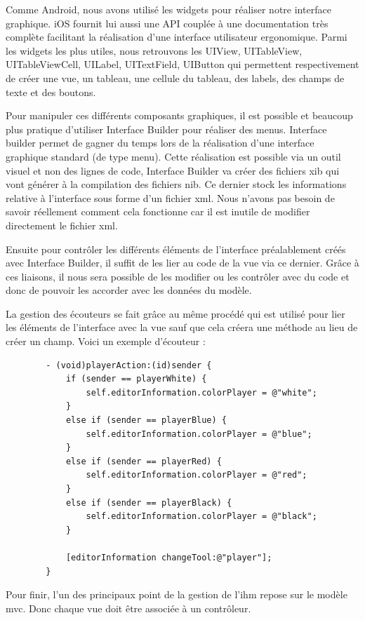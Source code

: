 	Comme Android, nous avons utilisé les widgets pour réaliser notre interface graphique. iOS fournit lui aussi une API couplée à une documentation très complète facilitant la réalisation d'une interface utilisateur ergonomique. Parmi les widgets les plus utiles, nous retrouvons les UIView, UITableView, UITableViewCell, UILabel, UITextField, UIButton qui permettent respectivement de créer une vue, un tableau, une cellule du tableau, des labels, des champs de texte et des boutons.
	
	Pour manipuler ces différents composants graphiques, il est possible et beaucoup plus pratique d'utiliser Interface Builder pour réaliser des menus. Interface builder permet de gagner du temps lors de la réalisation d'une interface graphique standard (de type menu). Cette réalisation est possible via un outil visuel et non des lignes de code,  Interface Builder va créer des fichiers \gls{xib} qui vont générer à la compilation des fichiers \gls{nib}. Ce dernier stock les informations relative à l'interface sous forme d'un fichier \gls{xml}. Nous n'avons pas besoin de savoir réellement comment cela fonctionne car il est inutile de modifier directement le fichier \gls{xml}.
	
	Ensuite pour contrôler les différents éléments de l'interface préalablement créés avec Interface Builder, il suffit de les lier au code de la vue via ce dernier. Grâce à ces liaisons, il nous sera possible de les modifier ou les contrôler avec du code et donc de pouvoir les accorder avec les données du modèle.
	
	La gestion des écouteurs se fait grâce au même procédé qui est utilisé pour lier les éléments de l'interface avec la vue sauf que cela créera une méthode au lieu de créer un champ. Voici un exemple d'écouteur :
	
	\begin{verbatim}
		- (void)playerAction:(id)sender {
		    if (sender == playerWhite) {
		        self.editorInformation.colorPlayer = @"white";
		    }
		    else if (sender == playerBlue) {
		        self.editorInformation.colorPlayer = @"blue";
		    }
		    else if (sender == playerRed) {
		        self.editorInformation.colorPlayer = @"red";
		    }
		    else if (sender == playerBlack) {
		        self.editorInformation.colorPlayer = @"black";
		    }
    
		    [editorInformation changeTool:@"player"];
		}
	\end{verbatim}
	
	Pour finir, l'un des principaux point de la gestion de l'\gls{ihm} repose sur le modèle \gls{mvc}. Donc chaque vue doit être associée à un contrôleur.
				
